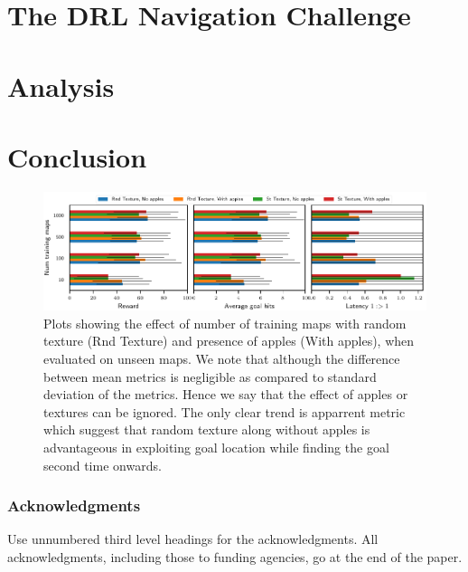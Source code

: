 \documentclass{article} %
\begin{document}
\section{The DRL Navigation Challenge}


\section{Analysis}


\section{Conclusion}


\begin{figure}%
  \includegraphics[width=\linewidth]{images/plot_ntrain_summary.pdf}%
  \vspace{-1em}%
  \caption{Plots showing the effect of number of training maps with random texture (Rnd Texture) and presence of apples (With apples), when evaluated on unseen maps. We note that although the difference between mean metrics is negligible as compared to standard deviation of the metrics. Hence we say that the effect of apples or textures can be ignored.
  The only clear trend is apparrent \LatencyOneGtOne{} metric which suggest that random texture along without apples is advantageous in exploiting goal location while finding the goal second time onwards.}
  \label{fig:num-training-maps}
\end{figure}

\subsubsection*{Acknowledgments}

Use unnumbered third level headings for the acknowledgments. All
acknowledgments, including those to funding agencies, go at the end of the paper.

{\small
{}

}
\end{document}
